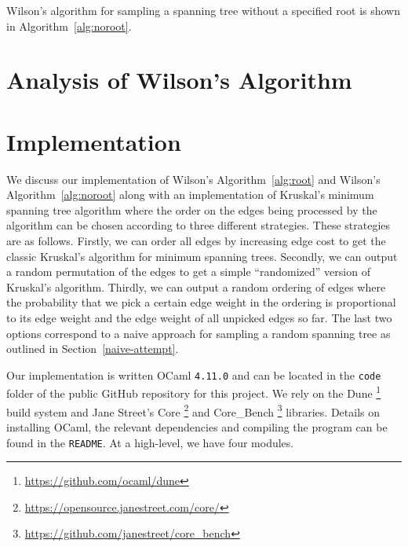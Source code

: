 \documentclass[11pt]{article}
\begin{document}
Wilson's algorithm for sampling a spanning tree without a specified root is
shown in Algorithm~\ref{alg:noroot}.

\section{Analysis of Wilson's Algorithm}


\section{Implementation}\label{imp}

We discuss our implementation of Wilson's Algorithm~\ref{alg:root} and Wilson's Algorithm~\ref{alg:noroot} along with an implementation of Kruskal's minimum spanning tree algorithm where the order on the edges being processed by the algorithm can be chosen according to three different strategies. These strategies are as follows. Firstly, we can order all edges by increasing edge cost to get the classic Kruskal's algorithm for minimum spanning trees. Secondly, we can output a random permutation of the edges to get a simple ``randomized'' version of Kruskal's algorithm. Thirdly, we can output a random ordering of edges where the probability that we pick a certain edge weight in the ordering is proportional to its edge weight and the edge weight of all unpicked edges so far. The last two options correspond to a naive approach for sampling a random spanning tree as outlined in Section~\ref{naive-attempt}.

Our implementation is written OCaml \texttt{4.11.0} and can be located in the \texttt{code} folder of the public GitHub repository  for this project. We rely on the Dune \footnote{\url{https://github.com/ocaml/dune}} build system and Jane Street's Core \footnote{\url{https://opensource.janestreet.com/core/}} and Core\_Bench \footnote{\url{https://github.com/janestreet/core_bench}} libraries. Details on installing OCaml, the relevant dependencies and compiling the program can be found in the \texttt{README}. At a high-level, we have four modules.
\end{document}
